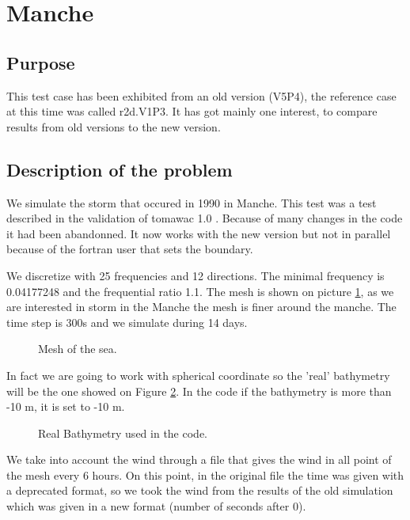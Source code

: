 \section{Manche}
%
%
\subsection{Purpose}
%
This test case has been exhibited from an old version (V5P4), the reference case at this time was called r2d.V1P3. It has got mainly one interest, to compare results from old versions to the new version.  

%
\subsection{Description of the problem}
We simulate the storm that occured in 1990 in Manche. This test was a test described in the validation of tomawac 1.0 \cite{Benoit1996_3}. Because of many changes in the code it had been abandonned. It now works with the new version but not in parallel because of the fortran user that sets the boundary. 

We discretize with 25 frequencies and 12 directions. The minimal frequency is 0.04177248 and the frequential ratio 1.1.
The mesh is shown on picture \ref{figmanchemesh}, as we are interested in storm in the Manche the mesh is finer around the manche. 
The time step is 300s and we simulate during 14 days. 
\begin{figure} [!h]
\centering
{}
 \caption{Mesh of the sea. }
\label{figmanchemesh}
\end{figure}

In fact we are going to work with spherical coordinate so the 'real' bathymetry will be the one showed on Figure \ref{realbathymanche}. In the code if the bathymetry is more than -10 m, it is set to -10 m.
\begin{figure} [!h]
\centering
{}
 \caption{Real Bathymetry used in the code.}
\label{realbathymanche}
\end{figure}

We take into account the wind through a file that gives the wind in all point of the mesh every 6 hours. On this point, in the original file the time was given with a deprecated format, so we took the wind from the results of the old simulation which was given in a new format (number of seconds after 0).

